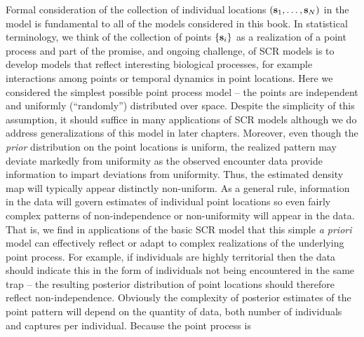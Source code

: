 {

Formal consideration of the collection of individual locations $({\bf
  s}_{1}, \ldots, {\bf s}_{N})$ in the model is fundamental to all of
the models considered in this book. In statistical terminology, we
think of the collection of points $\{ {\bf s}_{i} \}$ as a realization of a
point process and part of the promise, and ongoing challenge, of SCR
models is to develop models that reflect interesting biological
processes, for example interactions among points or temporal dynamics
in point locations.  Here we considered the simplest possible point
process model -- the points are independent and uniformly
(``randomly'') distributed over space. Despite the simplicity of this
assumption, it should suffice in many applications of SCR models
although we do address generalizations of this model in later
chapters. Moreover, even though the {\it prior} distribution on the
point locations is uniform, the realized pattern may deviate markedly
from uniformity as the observed encounter data provide information to
impart deviations from uniformity. Thus, the estimated density map
will typically appear distinctly non-uniform.  As a general rule,
information in the data will govern estimates of individual point
locations so even fairly complex patterns of non-independence or
non-uniformity will appear in the data. That is, we find in
applications of the basic SCR model that this simple {\it a priori}
model can effectively reflect or adapt to complex realizations of the
underlying point process.  For example, if individuals are highly
territorial then the data should indicate this in the form of
individuals not being encountered in the same trap -- the resulting
posterior distribution of point locations should therefore reflect
non-independence.  Obviously the complexity of posterior estimates of
the point pattern will depend on the quantity of data, both number of
individuals and captures per individual.  Because the point process is
}
